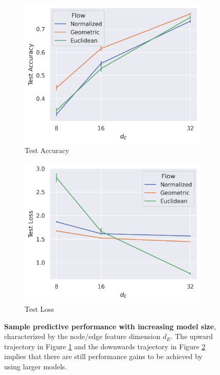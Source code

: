 \begin{figure}[t!]
    \centering
    \begin{subfigure}{0.47\linewidth}
        \centering
        \includegraphics[width=\linewidth]{figures/mnist/mnist_d_E_acc.png}
        \caption{\label{scale_acc}Test Accuracy}
    \end{subfigure}
    \begin{subfigure}{0.47\linewidth}
        \centering
        \includegraphics[width=\linewidth]{figures/mnist/mnist_d_E_loss.png}
        \caption{\label{scale_loss}Test Loss}
    \end{subfigure}
    \caption{\label{fig:scaling}\textbf{Sample predictive performance with increasing model size}, characterized by the node/edge feature dimension $d_E$. The upward trajectory in Figure \ref{scale_acc} and the downwards trajectory in Figure \ref{scale_loss} implies that there are still performance gains to be achieved by using larger models.} 
\end{figure}

